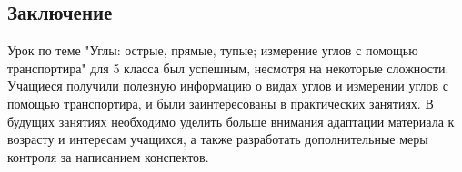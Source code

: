 \documentclass[a4paper,12pt]{article}
\begin{document}
\subsection*{Заключение}

Урок по теме "Углы: острые, прямые, тупые; измерение углов с помощью транспортира" для 5 класса был успешным, несмотря на некоторые сложности. Учащиеся получили полезную информацию о видах углов и измерении углов с помощью транспортира, и были заинтересованы в практических занятиях. В будущих занятиях необходимо уделить больше внимания адаптации материала к возрасту и интересам учащихся, а также разработать дополнительные меры контроля за написанием конспектов.
\end{document}
